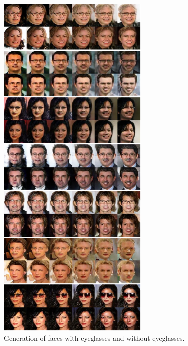 \begin{figure}[thb!]
\centering
\includegraphics[trim=0in 0in 0in 0in, width=0.65\textwidth]{result_face_eyeglasses_big1.pdf}
\caption{Generation of faces with eyeglasses and without eyeglasses.}
\label{fig::result_eyeglass1}
\end{figure}

